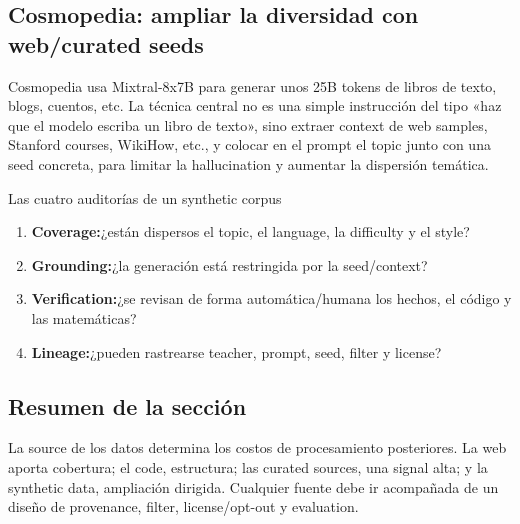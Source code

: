 \subsection{Cosmopedia: ampliar la diversidad con web/curated seeds}

Cosmopedia usa Mixtral-8x7B para generar unos 25B tokens de libros de texto, blogs, cuentos, etc. La técnica central no es una simple instrucción del tipo «haz que el modelo escriba un libro de texto», sino extraer context de web samples, Stanford courses, WikiHow, etc., y colocar en el prompt el topic junto con una seed concreta, para limitar la hallucination y aumentar la dispersión temática.



\begin{knowledgebox}{Las cuatro auditorías de un synthetic corpus}
\begin{enumerate}
  \item \textbf{Coverage:}¿están dispersos el topic, el language, la difficulty y el style?
  \item \textbf{Grounding:}¿la generación está restringida por la seed/context?
  \item \textbf{Verification:}¿se revisan de forma automática/humana los hechos, el código y las matemáticas?
  \item \textbf{Lineage:}¿pueden rastrearse teacher, prompt, seed, filter y license?
\end{enumerate}
\end{knowledgebox}


\subsection{Resumen de la sección}

La source de los datos determina los costos de procesamiento posteriores. La web aporta cobertura; el code, estructura; las curated sources, una signal alta; y la synthetic data, ampliación dirigida. Cualquier fuente debe ir acompañada de un diseño de provenance, filter, license/opt-out y evaluation.
